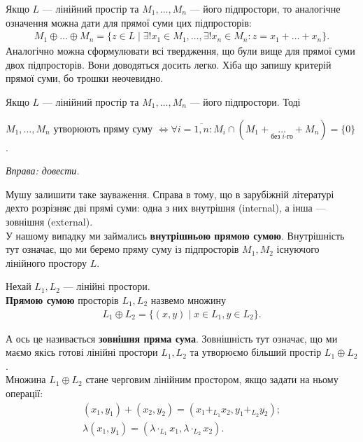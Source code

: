 \documentclass{math_library}
\begin{document}
	\begin{remark}
	Якщо $L$ --- лінійний простір та $M_1,\dots,M_n$ --- його підпростори, то аналогічне означення можна дати для прямої суми цих підпросторів:
	\begin{align*}
M_1  \oplus  \dots  \oplus  M_n = \{z \in L \mid \exists !x_1 \in M_1, \dots, \exists! x_n \in M_n: z = x_1 + \dots + x_n\}.
	\end{align*}
	Аналогічно можна сформулювати всі твердження, що були вище для прямої суми двох підпросторів. Вони доводяться досить легко. Хіба що запишу критерій прямої суми, бо трошки неочевидно.
	\end{remark}
	
	\begin{lemma}
	Якщо $L$ --- лінійний простір та $M_1,\dots,M_n$ --- його підпростори. Тоді
	\begin{center}
	$M_1,\dots,M_n$ утворюють пряму суму $\iff \forall i = \overline{1,n}: M_i \cap (M_1 + \underset{\text{без $i$-го}}{\dots} + M_n ) = \{0\}$.
	\end{center}
	\textit{Вправа: довести.}
	\end{lemma}
	
	\begin{remark}
	Мушу залишити таке зауваження. Справа в тому, що в зарубіжній літературі дехто розрізняє дві прямі суми: одна з них внутрішня (internal), а інша --- зовнішня (external).
	\bigskip \\
	У нашому випадку ми займались \textbf{внутрішньою прямою сумою}. Внутрішність тут означає, що ми беремо пряму суму із підпросторів $M_1,M_2$ існуючого лінійного простору $L$.
	\end{remark}
	
	\begin{definition}
	Нехай $L_1, L_2$ --- лінійні простори.\\
	\textbf{Прямою сумою} просторів $L_1,L_2$ назвемо множину
	\begin{align*}
	L_1 \oplus L_2 = \{ (x,y) \mid x \in L_1, y \in L_2\}.
	\end{align*}
	
	А ось це називається \textbf{зовнішня пряма сума}. Зовнішність тут означає, що ми маємо якісь готові лінійні простори $L_1,L_2$ та утворюємо більший простір $L_1 \oplus L_2$.
	\bigskip \\
	Множина $L_1 \oplus L_2$ стане черговим лінійним простором, якщо задати на ньому операції:
	\begin{align*}
	(x_1,y_1) + (x_2,y_2) = (x_1 +_{L_1} x_2,y_1 +_{L_2} y_2); \\
	\lambda (x_1, y_1) = (\lambda \cdot_{L_1} x_1, \lambda \cdot_{L_2} x_2).
	\end{align*}
	\end{definition}
	
\end{document}
